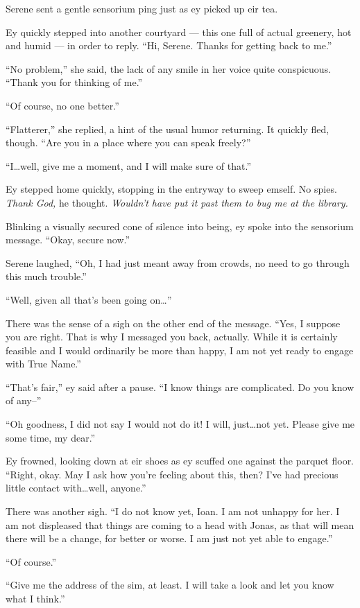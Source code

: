 Serene sent a gentle sensorium ping just as ey picked up eir tea.

Ey quickly stepped into another courtyard — this one full of actual greenery, hot and humid — in order to reply. ``Hi, Serene. Thanks for getting back to me.''

``No problem,'' she said, the lack of any smile in her voice quite conspicuous. ``Thank you for thinking of me.''

``Of course, no one better.''

``Flatterer,'' she replied, a hint of the usual humor returning. It quickly fled, though. ``Are you in a place where you can speak freely?''

``I\ldots well, give me a moment, and I will make sure of that.''

Ey stepped home quickly, stopping in the entryway to sweep emself. No spies. \emph{Thank God,} he thought. \emph{Wouldn't have put it past them to bug me at the library.}

Blinking a visually secured cone of silence into being, ey spoke into the sensorium message. ``Okay, secure now.''

Serene laughed, ``Oh, I had just meant away from crowds, no need to go through this much trouble.''

``Well, given all that's been going on\ldots{}''

There was the sense of a sigh on the other end of the message. ``Yes, I suppose you are right. That is why I messaged you back, actually. While it is certainly feasible and I would ordinarily be more than happy, I am not yet ready to engage with True Name.''

``That's fair,'' ey said after a pause. ``I know things are complicated. Do you know of any--''

``Oh goodness, I did not say I would not do it! I will, just\ldots not yet. Please give me some time, my dear.''

Ey frowned, looking down at eir shoes as ey scuffed one against the parquet floor. ``Right, okay. May I ask how you're feeling about this, then? I've had precious little contact with\ldots well, anyone.''

There was another sigh. ``I do not know yet, Ioan. I am not unhappy for her. I am not displeased that things are coming to a head with Jonas, as that will mean there will be a change, for better or worse. I am just not yet able to engage.''

``Of course.''

``Give me the address of the sim, at least. I will take a look and let you know what I think.''

